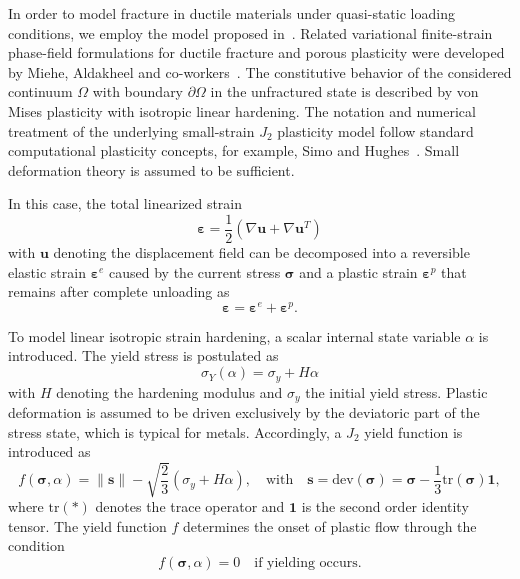 \documentclass[pdflatex,sn-mathphys-num]{sn-jnl}%
\theoremstyle{thmstyleone}%
\theoremstyle{thmstyletwo}%
\theoremstyle{thmstylethree}%
\begin{document}
In order to model fracture in ductile materials under quasi-static loading conditions, we employ the model proposed in~\cite{noll_3d_2020}. 
Related variational finite-strain phase-field formulations for ductile fracture and porous plasticity were developed by Miehe, Aldakheel and co-workers~\cite{miehe_phasefield_ductile_2016,miehe_phasefield_porous_2016,miehe_phasefield_implementation_2017}.
The constitutive behavior of the considered continuum $\Omega$ with boundary $\partial\Omega$ in the unfractured state is described by von Mises plasticity with isotropic linear hardening. 
The notation and numerical treatment of the underlying small-strain $J_2$ plasticity model follow standard computational plasticity concepts, for example, Simo and Hughes~\cite{simo_computational_1998}.
Small deformation theory is assumed to be sufficient.

In this case, the total linearized strain
\begin{equation}
    \boldsymbol{\varepsilon} = \dfrac{1}{2}\left(\nabla{\boldsymbol{u}} + \nabla{\boldsymbol{u}}^T\right)
\end{equation}
with $\boldsymbol{u}$ denoting the displacement field can be decomposed into a reversible elastic strain $\boldsymbol{\varepsilon}^e$ caused by the current stress $\boldsymbol{\sigma}$ and a plastic strain $\boldsymbol{\varepsilon}^p$ that remains after complete unloading as
\begin{equation}
  \boldsymbol{\varepsilon} =  \boldsymbol{\varepsilon}^e + \boldsymbol{\varepsilon}^p.
\end{equation}

To model linear isotropic strain hardening, a scalar internal state variable $\alpha$ is introduced. 
The yield stress is postulated as
\begin{equation}
    \sigma_Y(\alpha) = \sigma_y + H\alpha
\end{equation}
with $H$ denoting the hardening modulus and $\sigma_y$ the initial yield stress. 
Plastic deformation is assumed to be driven exclusively by the deviatoric part of the stress state, which is typical for metals. 
Accordingly, a $J_2$ yield function is introduced as
\begin{equation}
    f(\boldsymbol{\sigma},\alpha) = \|\boldsymbol{s}\| - \sqrt{\dfrac{2}{3}}\left(\sigma_y+H\alpha\right), 
    \quad \text{with} \quad 
    \boldsymbol{s} = \text{dev}\left(\boldsymbol{\sigma}\right) = \boldsymbol{\sigma}-\dfrac{1}{3}\text{tr}\left(\boldsymbol{\sigma}\right)\boldsymbol{1},
\end{equation}
where $\text{tr}(*)$ denotes the trace operator and $\boldsymbol{1}$ is the second order identity tensor.
The yield function $f$ determines the onset of plastic flow through the condition
\begin{equation}
    f(\boldsymbol{\sigma},\alpha) = 0 \quad \text{if yielding occurs}.
\end{equation}
\end{document}
